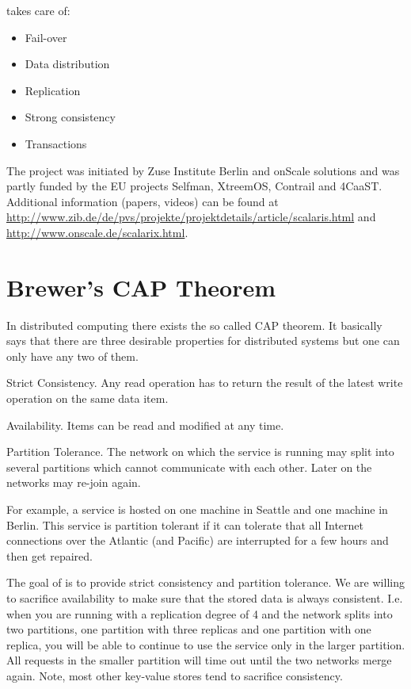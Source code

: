 \scalaris{} takes care of:

\begin{itemize}
\item Fail-over
\item Data distribution
\item Replication
\item Strong consistency
\item Transactions
\end{itemize}

The \scalaris{} project was initiated by Zuse Institute Berlin and onScale
solutions and was partly funded by the EU projects Selfman, XtreemOS,
Contrail and 4CaaST. Additional information (papers, videos) can be found at
\url{http://www.zib.de/de/pvs/projekte/projektdetails/article/scalaris.html}
and \url{http://www.onscale.de/scalarix.html}.

\section{Brewer's CAP Theorem}

In distributed computing there exists the so called CAP theorem. It
basically says that there are three desirable properties for distributed
systems but one can only have any two of them.

\begin{description}
\item {Strict Consistency.} Any read operation has to return the
  result of the latest write operation on the same data item.

\item {Availability.} Items can be read and modified at any time.

\item {Partition Tolerance.} The network on which the service is
  running may split into several partitions which cannot communicate
  with each other. Later on the networks may re-join again.

  For example, a service is hosted on one machine in Seattle and one
  machine in Berlin. This service is partition tolerant if it can
  tolerate that all Internet connections over the Atlantic (and
  Pacific) are interrupted for a few hours and then get repaired.
\end{description}

The goal of \scalaris{} is to provide strict consistency and partition
tolerance. We are willing to sacrifice availability to make sure that
the stored data is always consistent. I.e. when you are running
\scalaris{} with a replication degree of 4 and the network splits into
two partitions, one partition with three replicas and one partition
with one replica, you will be able to continue to use the service only
in the larger partition. All requests in the smaller partition will
time out until the two networks merge again. Note, most other
key-value stores tend to sacrifice consistency.

